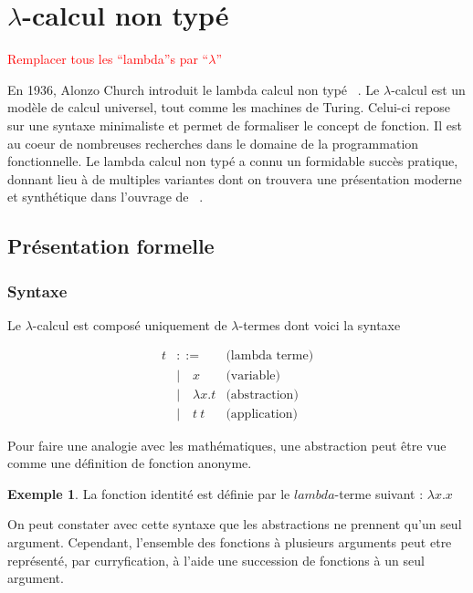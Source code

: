 \documentclass {article}
\theoremstyle{definition}
\newtheorem{example}{Exemple}
\theoremstyle{remark}
\newcommand{\todo}[1]{\textcolor{red}{#1}}
\begin{document}
\section{$\lambda$-calcul non typé}

\todo{Remplacer tous les ``lambda''s par ``$\lambda$''}

En 1936, Alonzo Church introduit le lambda calcul non typé
~\citep{church:lambda-calcul}. Le $\lambda$-calcul est
un modèle de calcul universel, tout comme les machines de Turing. Celui-ci repose
sur une syntaxe minimaliste et permet de formaliser le concept de fonction. Il est au coeur de nombreuses recherches dans le domaine de la 
programmation fonctionnelle. Le lambda calcul non typé a connu un formidable 
succès pratique, donnant lieu à de multiples variantes dont on trouvera une présentation
 moderne et synthétique dans l'ouvrage de ~\citet{pierce:tapl}.


\subsection{Présentation formelle}

\subsubsection{Syntaxe}
Le $\lambda$-calcul est composé uniquement de \(\lambda\)-termes dont voici la syntaxe

\newcommand{\Lam}[2]{\ensuremath{\lambda #1. #2}}
\newcommand{\App}[2]{\ensuremath{#1\:#2}}
\newcommand{\Var}[1]{\ensuremath{#1}}


\begin{align*}
  t &::= & \mbox{(lambda terme)} \\
  &|\quad \Var{x} & \mbox{(variable)} \\
  &|\quad \Lam{x}{t} & \mbox{(abstraction)} \\
  &|\quad \App{t}{t}          & \mbox{(application)}
\end{align*}

Pour faire une analogie avec les mathématiques, une abstraction peut
être vue comme une définition de fonction anonyme.
 
\begin{example}
 La fonction identité est définie par le $lambda$-terme suivant : $\Lam{x}{\Var{x}}$
\end{example}

On peut constater avec cette syntaxe que les abstractions ne prennent
qu'un seul argument. Cependant, l'ensemble des fonctions à plusieurs
arguments peut etre représenté, par curryfication, à l'aide une
succession de fonctions à un seul argument.
\end{document}
